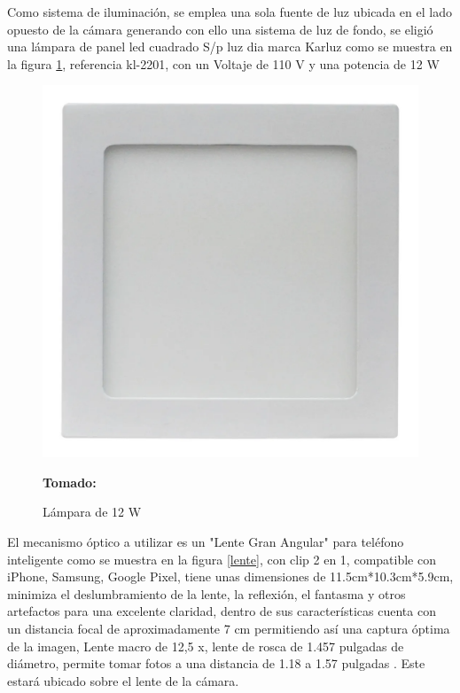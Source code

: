 \documentclass[12pt,twocolumn,a4paper]{article}
\begin{document}
Como sistema de iluminación, se emplea una sola fuente de  luz  ubicada en el lado opuesto de la  cámara generando con ello una sistema de luz de fondo, se eligió una lámpara de panel led  cuadrado S/p luz dia marca Karluz como se muestra en la figura \ref{lampara}, referencia kl-2201, con un Voltaje de 110 V  y una potencia de 12 W \cite{lampara} 

\begin{figure}[h]
	\centering
	\includegraphics[scale=0.2]{lampara.jpg}
	\caption{Lámpara de 12 W} \textbf{Tomado:} \cite{lampara}
	\label{lampara}
\end{figure}

El mecanismo óptico a utilizar es un "Lente Gran Angular" para teléfono inteligente como se muestra en la figura \ref{lente}, con clip 2 en 1,  compatible con iPhone, Samsung, Google Pixel, tiene unas dimensiones de 11.5cm*10.3cm*5.9cm, minimiza el deslumbramiento de la lente, la reflexión, el fantasma y otros artefactos para una excelente claridad,  dentro de sus características cuenta con un distancia focal de aproximadamente 7 cm permitiendo así una captura óptima de la imagen, Lente macro de 12,5 x,  lente de rosca de 1.457 pulgadas de diámetro, permite tomar fotos a una distancia de 1.18 a 1.57 pulgadas \cite{lente}. Este estará ubicado sobre el lente de la cámara.
\end{document}
